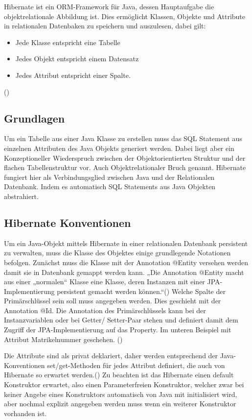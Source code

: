 Hibernate ist ein ORM-Framework für Java, dessen Hauptaufgabe die objektrelationale Abbildung ist. Dies ermöglicht Klassen, Objekte und Attribute in relationalen Datenbaken zu speichern und auszulesen, dabei gilt:

\begin{itemize}
	\item Jede Klasse entspricht eine Tabelle
	\item Jedes Objekt entspricht einem Datensatz
	\item Jedes Attribut entspricht einer Spalte.
\end{itemize}
(\cite[S. 280]{Piep1})

\subsection{Grundlagen}

Um ein Tabelle aus einer Java Klasse zu erstellen muss das SQL Statement aus einzelnen Attributen des Java Objekts generiert werden. Dabei liegt aber ein Konzeptioneller Wiederspruch zwischen der Objektorientierten Struktur und der flachen Tabellenstruktur vor. Auch Objektrelationaler Bruch genannt. Hibernate fungiert hier als Verbindungsglied zwischen Java und der Relationalen Datenbank. Indem es automatisch SQL Statements aus Java Objekten abstrahiert.


\subsection{Hibernate Konventionen}

Um ein Java-Objekt mittels Hibernate in einer relationalen Datenbank persistent zu verwalten, muss die Klasse des Objektes einige grundlegende Notationen befolgen. Zunächst muss die Klasse mit der Annotation @Entity versehen werden damit sie in Datenbank gemappt werden kann. „Die Annotation @Entity macht aus einer „normalen“ Klasse eine Klasse, deren Instanzen mit einer JPA-Implementierung persistent gemacht werden können.“(\cite[S. 32]{MW1}) Welche Spalte der Primärschlüssel sein soll muss angegeben werden. Dies geschieht mit der Annotation @Id. Die Annotation des Primärschlüssels kann bei der Instanzvariablen oder bei Getter/ Setter-Paar stehen und definiert damit dem Zugriff der JPA-Implementierung auf das Property. Im unteren Beispiel mit Attribut Matrikelnummer geschehen. (\cite[S. 32]{MW1})

Die Attribute sind als privat deklariert, daher werden entsprechend der Java-Konventionen set/get-Methoden für jedes Attribut definiert, die auch von Hibernate so erwartet werden.(\cite[S. 454]{SSH1}) Zu beachten ist das Hibernate einen default Konstruktor erwartet, also einen Parameterfreien Konstruktor, welcher zwar bei keiner Angebe eines Konstruktors automatisch von Java mit initialisiert wird, aber nochmal explizit angegeben werden muss wenn ein weiterer Konstruktor vorhanden ist.

